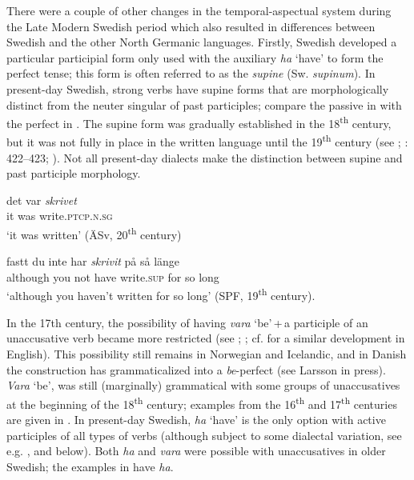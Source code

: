 \documentclass[output=paper]{langscibook}
\begin{document}
There were a couple of other changes in the temporal-aspectual system during the Late Modern Swedish period which also resulted in differences between Swedish and the other North Germanic languages. Firstly, Swedish developed a particular participial form only used with the auxiliary \textit{ha} ‘have’ to form the perfect tense; this form is often referred to as the \textit{supine} (Sw. \textit{supinum}). In present-day Swedish, strong verbs have supine forms that are morphologically distinct from the neuter singular of past participles; compare the passive in  with the perfect in . The supine form was gradually established in the 18\textsuperscript{th} century, but it was not fully in place in the written language until the 19\textsuperscript{th} century (see \citealt{Platzack1981}; \citealt{Larsson2009}: 422–423; \citealt{Backstrom2019}). Not all present-day dialects make the distinction between supine and past participle morphology.


\ea\label{ex:intro:7}
\ea\label{ex:intro:7a}
\gll  det    var \textit{skrivet} \\
it   was write.\textsc{ptcp.n.sg}\\
\glt    ‘it was written’ (ÄSv, 20\textsuperscript{th} century)


\ex\label{ex:intro:7b}
\gll  fastt       du   inte   har \textit{skrivit}  på   så   länge\\
      although   you   not   have   write.\textsc{sup}   for   so long\\
\glt    ‘although you haven’t written for so long’ (SPF, 19\textsuperscript{th} century).
\z
\z


In the 17th century, the possibility of having \textit{vara} ‘be’\,+\,a participle of an unaccusative verb became more restricted (see \citealt{Johannisson1945}; \citealt{Larsson2009,Larsson2015}; cf. \citealt{McFaddenAlexiadou2005} for a similar development in English). This possibility still remains in Norwegian and Icelandic, and in Danish the construction has grammaticalized into a \textit{be}{}-perfect (see Larsson in press). \textit{Vara} ‘be’, was still (marginally) grammatical with some groups of unaccusatives at the beginning of the 18\textsuperscript{th} century; examples from the 16\textsuperscript{th} and 17\textsuperscript{th} centuries are given in . In present-day Swedish, \textit{ha} ‘have’ is the only option with active participles of all types of verbs (although subject to some dialectal variation, see e.g. \citealt{Larsson2014HAVE}, and  below). Both \textit{ha} and \textit{vara} were possible with unaccusatives in older Swedish; the examples in  have \textit{ha}.
\end{document}
